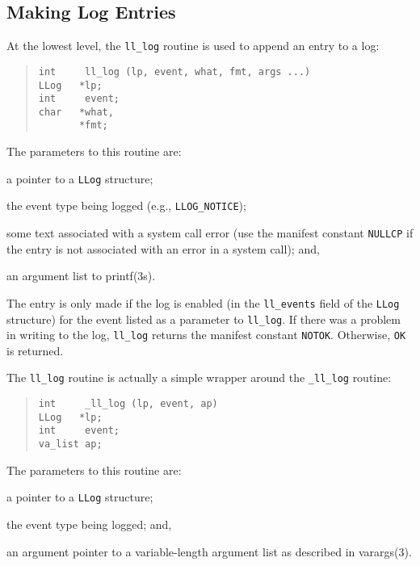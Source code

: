 \subsection	{Making Log Entries}
At the lowest level, the \verb"ll_log" routine is used to append an entry to a
log: 
\begin{quote}\small\begin{verbatim}
int     ll_log (lp, event, what, fmt, args ...)
LLog   *lp;
int     event;
char   *what,
       *fmt;
\end{verbatim}
\end{quote}
The parameters to this routine are:
\begin{describe}
\item[\verb"lp":] a pointer to a \verb"LLog" structure;

\item[\verb"event":] the event type being logged (e.g., \verb"LLOG_NOTICE");

\item[\verb"what":] some text associated with a system call error
(use the manifest constant \verb"NULLCP" if the entry is not associated with
an error in a system call); and,

\item[\verb"fmt"/\verb"args":] an argument list to \man printf(3s).
\end{describe}
The entry is only made if the log is enabled
(in the \verb"ll_events" field of the \verb"LLog" structure)
for the event listed as a parameter to \verb"ll_log".
If there was a problem in writing to the log,
\verb"ll_log" returns the manifest constant \verb"NOTOK".
Otherwise, \verb"OK" is returned.

The \verb"ll_log" routine is actually a simple wrapper around the
\verb"_ll_log" routine:
\begin{quote}\small\begin{verbatim}
int     _ll_log (lp, event, ap)
LLog   *lp;
int     event;
va_list ap;
\end{verbatim}
\end{quote}
The parameters to this routine are:
\begin{describe}
\item[\verb"lp":] a pointer to a \verb"LLog" structure;

\item[\verb"event":] the event type being logged; and,

\item[\verb"ap":] an argument pointer to a variable-length argument list
as described in \man varargs(3).
\end{describe}

